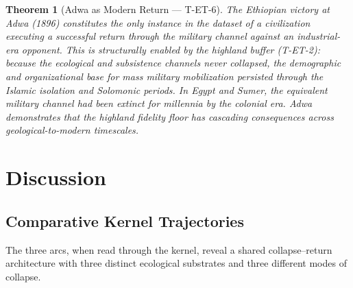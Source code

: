 \documentclass[
  aps,
  prd,
  twocolumn,
  superscriptaddress,
  nofootinbib,
  floatfix
]{revtex4-2}
\newtheorem{theorem}{Theorem}
\begin{document}
\begin{theorem}[Adwa as Modern Return ---
T-ET-6]\label{thm:adwa}
The Ethiopian victory at Adwa (1896) constitutes
the only instance in the dataset of a civilization
executing a successful return through the military
channel against an industrial-era opponent.  This is
structurally enabled by the highland buffer
(T-ET-2): because the ecological and subsistence
channels never collapsed, the demographic and
organizational base for mass military mobilization
persisted through the Islamic isolation and
Solomonic periods.  In Egypt and Sumer, the
equivalent military channel had been extinct for
millennia by the colonial era.  Adwa demonstrates
that the highland fidelity floor has cascading
consequences across geological-to-modern timescales.
\end{theorem}


\section{Discussion}\label{sec:discussion}

\subsection{Comparative Kernel Trajectories}

The three arcs, when read through the kernel, reveal
a shared collapse--return architecture with three
distinct ecological substrates and three different
modes of collapse.
\end{document}
